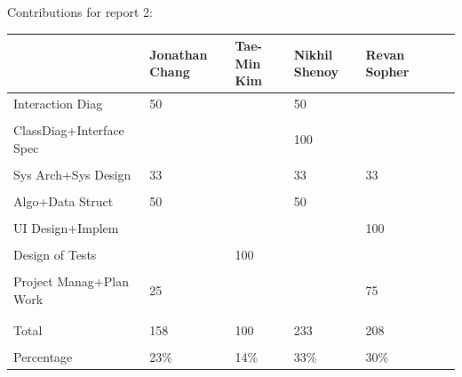 \documentclass[letterpaper,english, 12pt]{scrreprt}
\begin{document}
Contributions for report 2:\\
\begin{center}
	\begin{tabular}{|l|C{2cm}|C{2cm}|C{2cm}|C{2cm}|C{2cm}|C{2cm}|}
		\hline
                        & Jonathan Chang& Tae-Min Kim   & Nikhil Shenoy & Revan Sopher  \\ \hline
Interaction Diag        &      50       &               &      50       &               \\ \hline
                        &               &               &               &               \\ \hline
ClassDiag+Interface Spec&               &               &     100       &               \\ \hline
                        &               &               &               &               \\ \hline
Sys Arch+Sys Design     &      33       &               &      33       &     33        \\ \hline
                        &               &               &               &               \\ \hline
Algo+Data Struct        &      50       &               &      50       &               \\ \hline
                        &               &               &               &               \\ \hline
UI Design+Implem        &               &               &               &    100        \\ \hline
                        &               &               &               &               \\ \hline
Design of Tests         &               &      100      &               &               \\ \hline
                        &               &               &               &               \\ \hline
Project Manag+Plan Work &      25       &               &               &     75        \\ \hline
                        &               &               &               &               \\ \hline

                        &               &               &               &               \\ \hline
Total                   &     158       &      100      &     233       &    208        \\ \hline
                        &               &               &               &               \\ \hline
Percentage              &      23\%     &      14\%     &      33\%     &     30\%      \\ \hline
	\end{tabular}
\end{center}
\end{document}
